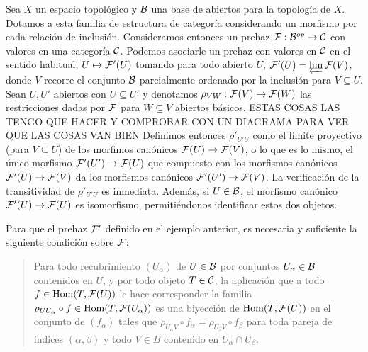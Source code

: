 \documentclass[twoside]{article}
\begin{document}
\begin{ej}[EGA, 0-3.2.1]\label{prehaztop}%
Sea $X$ un espacio topológico y ${\mathcal B}$ una base de abiertos para la topología de $X$. Dotamos a esta familia de estructura de categoría considerando un morfismo por cada relación de inclusión. Consideramos entonces un prehaz $\mathcal{F}:{\mathcal B}^{op}\to{\mathcal C}$ con valores en una categoría ${\mathcal C}$. Podemos asociarle un prehaz con valores en ${\mathcal C}$ en el sentido habitual, $U\mapsto \mathcal{F}'(U)$ tomando para todo abierto $U$, $\mathcal{F}'(U)=\varprojlim\mathcal{F}(V)$, donde $V$ recorre el conjunto ${\mathcal B}$ parcialmente ordenado por la inclusión para $V\subseteq U$. Sean $U,U'$ abiertos con $U\subseteq U'$ y denotamos $\rho_{VW}:\mathcal{F}(V)\to\mathcal{F}(W)$ las restricciones dadas por $\mathcal{F}$ para $W\subseteq V$ abiertos básicos. ESTAS COSAS LAS TENGO QUE HACER Y COMPROBAR CON UN DIAGRAMA PARA VER QUE LAS COSAS VAN BIEN Definimos entonces $\rho'_{U'U}$ como el límite proyectivo (para $V\subseteq U$) de los morfimos canónicos $\mathcal{F}(U)\to\mathcal{F}(V)$, o lo que es lo mismo, el único morfismo $\mathcal{F}'(U')\to\mathcal{F}(U)$ que compuesto con los morfismos canónicos $\mathcal{F}'(U)\to\mathcal{F}(V)$ da los morfismos canónicos $\mathcal{F}'(U')\to\mathcal{F}(V)$. La verificación de la transitividad de $\rho'_{U'U}$ es inmediata. Además, si $U\in{\mathcal B}$, el morfismo canónico $\mathcal{F}'(U)\to\mathcal{F}(U)$ es isomorfismo, permitiéndonos identificar estos dos objetos.
\end{ej}
\begin{prop}[EGA, 0-3.2.2]\label{haztop}
Para que el prehaz $\mathcal{F}'$ definido en el ejemplo anterior, es necesaria y suficiente la siguiente condición sobre $\mathcal{F}$:

\begin{verse}


Para todo recubrimiento $(U_{\alpha})$ de $U\in{\mathcal B}$ por conjuntos $U_\alpha\in{\mathcal B}$ contenidos en $U$, y por todo objeto $T\in{\mathcal C}$, la aplicación que a todo $f\in\operatorname{Hom}(T,\mathcal{F}(U))$ le hace corresponder la familia $\rho_{UU_\alpha}\circ f\in\operatorname{Hom}(T,\mathcal{F}(U_\alpha))$ es una biyección de $\operatorname{Hom}(T,\mathcal{F}(U))$ en el conjunto de $(f_\alpha)$ tales que $\rho_{U_\alpha V}\circ f_\alpha=\rho_{U_\beta V}\circ f_\beta$ para toda pareja de índices $(\alpha,\beta)$ y todo $V\in B$ contenido en $U_\alpha\cap U_\beta$. 
\end{verse}
\end{prop}
\end{document}

